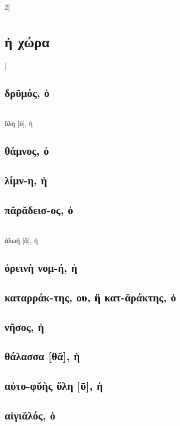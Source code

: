 \documentclass{book}
\begin{document}
\begin{multicols}{2}[\section{ἡ χώρα}]
\subsection{δρῡμός, ὁ}
 ~\\
ὕλη [ῡ], ἡ 
\subsection{θάμνος, ὁ}
\subsection{λίμν-η, ἡ}
\subsection{πᾰρᾰδεισ-ος, ὁ}
 ~\\
ἀλωή [ᾰ], ἡ
\subsection{ὀρεινὴ νομ-ή, ἡ} 
\subsection{καταρράκ-της, ου, ἢ κατ-ᾰράκτης, ὁ}
\subsection{νῆσος, ἡ}
\subsection{θάλασσα [θᾰ], ἡ}
\subsection{αὐτο-φῠὴς ὕλη [ῡ], ἡ}
\subsection{αἰγιᾰλός, ὁ}
~
\end{multicols}
\newpage  
\end{document}
